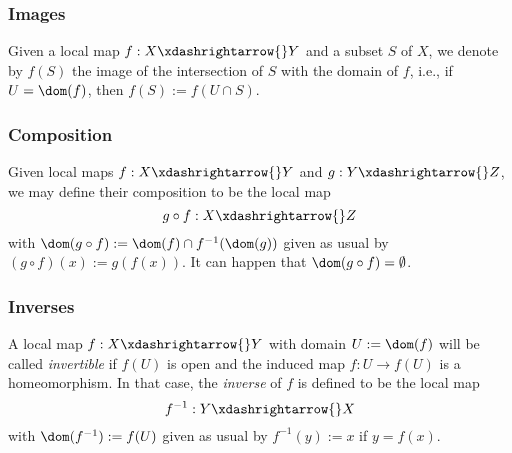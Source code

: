 \documentclass[reqno]{amsart} 
\begin{document}
\subsubsection{Images\label{sec:partial-map-images}}
\label{sec:orgf825d0e}
Given a local map $f : X \xdashrightarrow{} Y$
and a subset $S$ of $X$,
we denote by $f(S)$ the image of the intersection
of $S$ with the domain of $f$,
i.e., if $U = \dom(f)$,
then $f(S) := f(U \cap S)$.


\subsubsection{Composition}
\label{sec:org7f9108b}
Given local maps $f : X \xdashrightarrow{} Y$
and $g : Y \xdashrightarrow{} Z$,
we may define their composition
to be the local map 
\begin{equation*}
g \circ f : X \xdashrightarrow{} Z
\end{equation*}
with $\dom(g \circ f) := \dom(f) \cap f^{-1}(\dom(g))$ given as usual by $(g \circ f)(x) := g(f(x))$.
It can happen that $\dom(g \circ f) = \emptyset$.

\subsubsection{Inverses}
\label{sec:orga0b7c1f}
A local map $f : X \xdashrightarrow{} Y$
with domain $U := \dom(f)$
will be called \emph{invertible}
if $f(U)$ is open
and the induced map $f : U \rightarrow f(U)$
is a homeomorphism.
In that case,
the \emph{inverse} of $f$
is defined to be the local map
\begin{equation*}
f^{-1} : Y \xdashrightarrow{} X
\end{equation*}
with $\dom(f^{-1}) := f(U)$
given as usual by $f^{-1}(y) := x$ if $y = f(x)$.


\end{document}
